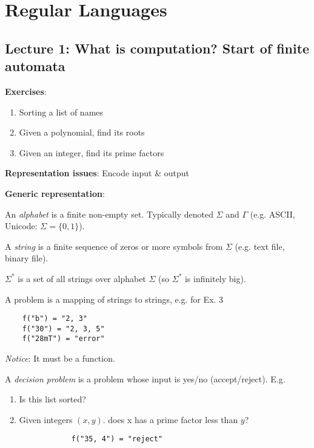
\chapter{Regular Languages}

\section*{Lecture 1: What is computation? Start of finite automata}


\textbf{Exercises}:

\begin{enumerate}
    \item Sorting a list of names
    \item Given a polynomial, find its roots
    \item Given an integer, find its prime factors
\end{enumerate}

\textbf{Representation issues}: Encode input \& output

\textbf{Generic representation}:

\begin{definition}
    An \emph{alphabet} is a finite non-empty set. Typically denoted $\Sigma$ and $\Gamma$ (e.g. ASCII, Unicode: $\Sigma = \{0, 1\}$).
\end{definition}

\begin{definition}
    A \emph{string} is a finite sequence of zeros or more symbols from $\Sigma$ (e.g. text file, binary file).
\end{definition}

\begin{definition}
    $\Sigma^*$ is a set of all strings over alphabet $\Sigma$ (so $\Sigma^*$ is infinitely big).
\end{definition}

A problem is a mapping of strings to strings, e.g. for Ex. 3

\begin{verbatim}
    f("b") = "2, 3"
    f("30") = "2, 3, 5"
    f("28mT") = "error"
\end{verbatim}

\emph{Notice}: It must be a function.

\begin{definition}
    A \emph{decision problem} is a problem whose input is yes/no (accept/reject). E.g.

    \begin{enumerate}
        \item Is this list sorted?
        \item Given integers $(x, y)$. does x has a prime factor less than $y$?

        \begin{verbatim}
            f("35, 4") = "reject"
        \end{verbatim}
    \end{enumerate}
\end{definition}

